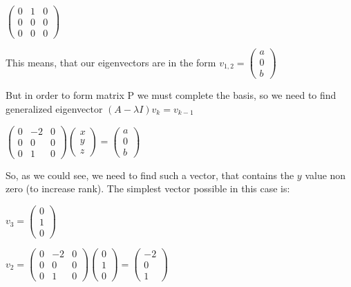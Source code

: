\documentclass[12pt,letterpaper]{article}
\begin{document}
$\begin{pmatrix}
            0 & 1 & 0 \\
            0 & 0 & 0 \\
            0 & 0 & 0
        \end{pmatrix}$
        
This means, that our eigenvectors are in the form $v_{1, 2} = \begin{pmatrix}
            a \\
            0 \\
            b
        \end{pmatrix}$
        
But in order to form matrix P we must complete the basis, so we need to find generalized eigenvector $(A - \lambda I)v_k = v_{k-1}$

$\begin{pmatrix}
            0 & -2 & 0 \\
            0 & 0 & 0 \\
            0 & 1 & 0
        \end{pmatrix}\begin{pmatrix}
            x \\
            y \\
            z
        \end{pmatrix} = \begin{pmatrix}
            a \\
            0 \\
            b
        \end{pmatrix}$
        
So, as we could see, we need to find such a vector, that contains the $y$ value non zero (to increase rank). The simplest vector possible in this case is:

$v_3 = \begin{pmatrix}
            0 \\
            1 \\
            0
        \end{pmatrix}$
        
$v_ 2 = \begin{pmatrix}
            0 & -2 & 0 \\
            0 & 0 & 0 \\
            0 & 1 & 0
        \end{pmatrix}\begin{pmatrix}
            0 \\
            1 \\
            0
        \end{pmatrix} = \begin{pmatrix}
            -2 \\
            0 \\
            1
        \end{pmatrix}$
\end{document}
